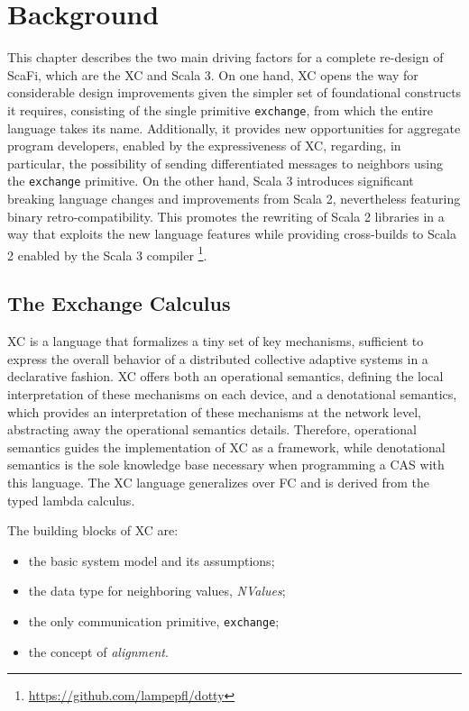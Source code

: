 \chapter{Background}
\label{chap:background}
This chapter describes the two main driving factors for a complete re-design of ScaFi, which are the \ac{XC} and Scala 3.
%
On one hand, \ac{XC} opens the way for considerable design improvements given the simpler set of foundational constructs it requires, consisting of the single primitive \texttt{exchange}, from which the entire language takes its name.
%
Additionally, it provides new opportunities for aggregate program developers, enabled by the expressiveness of \ac{XC}, regarding, in particular, the possibility of sending differentiated messages to neighbors using the \texttt{exchange} primitive\cite{xc}.
%
On the other hand, Scala 3 introduces significant breaking language changes and improvements from Scala 2, nevertheless featuring binary retro-compatibility.
%
This promotes the rewriting of Scala 2 libraries in a way that exploits the new language features while providing cross-builds to Scala 2 enabled by the Scala 3 compiler \footnote{\url{https://github.com/lampepfl/dotty}}.

\section{The Exchange Calculus}\label{chap:background->sec:xc}

\ac{XC} is a language that formalizes a tiny set of key mechanisms, sufficient to express the overall behavior of a distributed collective adaptive systems in a declarative fashion\cite{xc}.
%
\ac{XC} offers both an operational semantics, defining the local interpretation of these mechanisms on each device, and a denotational semantics, which provides an interpretation of these mechanisms at the network level, abstracting away the operational semantics details.
%
Therefore, operational semantics guides the implementation of \ac{XC} as a framework, while denotational semantics is the sole knowledge base necessary when programming a \ac{CAS} with this language.
%
The \ac{XC} language generalizes over \ac{FC} and is derived from the typed lambda calculus\cite{xc}.

The building blocks of \ac{XC} are:
\begin{itemize}
    \item the basic system model and its assumptions;
    \item the data type for neighboring values, \textit{NValues};
    \item the only communication primitive, \texttt{exchange};
    \item the concept of \textit{alignment}.
\end{itemize}

